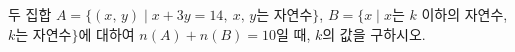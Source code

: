 두 집합 $A=\{(x,\,y) \mid x+3y=14,\ x,\,y$는 자연수$\}$, $B=\{x \mid x$는 $k$ 이하의 자연수, $k$는 자연수$\}$에 대하여 $n(A)+n(B)=10$일 때, $k$의 값을 구하시오.
